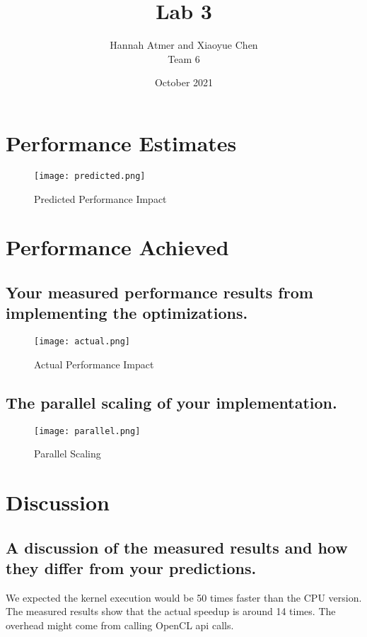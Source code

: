\documentclass{article}
\title{Lab 3}
\author{Hannah Atmer and Xiaoyue Chen \\ Team 6}
\date{October 2021}
\begin{document}
\maketitle

\section{Performance Estimates}

\begin{figure}[h!t]
    \centering
    \texttt{[image: predicted.png]}
    \caption{Predicted Performance Impact}
    \label{fig:predicted}
\end{figure}

\section{Performance Achieved}

\subsection{Your measured performance results from implementing the optimizations.}

\begin{figure}[h!t]
    \centering
    \texttt{[image: actual.png]}
    \caption{Actual Performance Impact}
    \label{fig:actual}
\end{figure}

\subsection{The parallel scaling of your implementation.}

\begin{figure}[h!t]
    \centering
    \texttt{[image: parallel.png]}
    \caption{Parallel Scaling}
    \label{fig:parallel}
\end{figure}

\section{Discussion}

\subsection{A discussion of the measured results and how they differ
  from your predictions.}
We expected the kernel execution would be 50 times faster than the CPU
version. The measured results show that the actual speedup is around
14 times. The overhead might come from calling OpenCL api calls.
\end{document}
